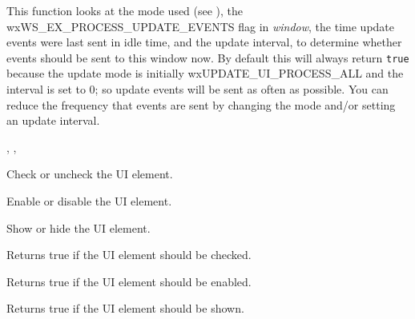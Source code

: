 This function looks at the mode used (see ),
the wxWS\_EX\_PROCESS\_UPDATE\_EVENTS flag in {\it window},
the time update events were last sent in idle time, and
the update interval, to determine whether events should be sent to
this window now. By default this will always return {\tt true} because
the update mode is initially wxUPDATE\_UI\_PROCESS\_ALL and
the interval is set to 0; so update events will be sent as
often as possible. You can reduce the frequency that events
are sent by changing the mode and/or setting an update interval.


, 
, 

\label{wxupdateuieventcheck}


Check or uncheck the UI element.

\label{wxupdateuieventenable}


Enable or disable the UI element.

\label{wxupdateuieventshow}


Show or hide the UI element.

\label{wxupdateuieventgetchecked}


Returns true if the UI element should be checked.

\label{wxupdateuieventgetenabled}


Returns true if the UI element should be enabled.

\label{wxupdateuieventgetshown}


Returns true if the UI element should be shown.


